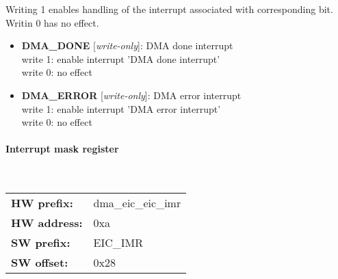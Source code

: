 \vspace{12pt}
Writing 1 enables handling of the interrupt associated with corresponding bit. Writin 0 has no effect.

\vspace{12pt}
\noindent
{}

\begin{itemize}
\item \begin{small}
{\bf 
DMA\_DONE
} [\emph{write-only}]: DMA done interrupt
\\
write 1: enable interrupt 'DMA done interrupt'\\write 0: no effect
\end{small}
\item \begin{small}
{\bf 
DMA\_ERROR
} [\emph{write-only}]: DMA error interrupt
\\
write 1: enable interrupt 'DMA error interrupt'\\write 0: no effect
\end{small}
\end{itemize}
\paragraph*{Interrupt mask register}\mbox{}\\\vskip 6pt
\begin{tabular}{l l }
{\bf HW prefix:}  & dma\_eic\_eic\_imr\\
{\bf HW address:}  & 0xa\\
{\bf SW prefix:}  & EIC\_IMR\\
{\bf SW offset:}  & 0x28\\
\end{tabular}

